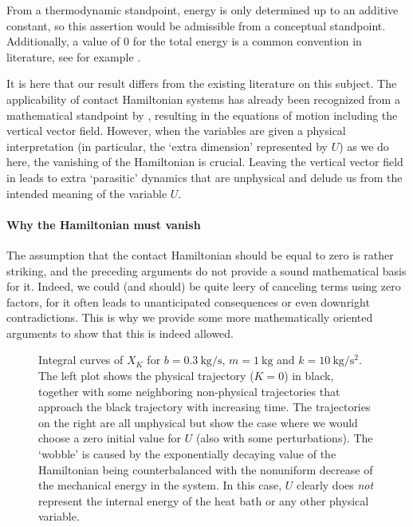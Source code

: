From a thermodynamic standpoint, energy is only determined up to an additive constant, so this assertion would be admissible from a conceptual standpoint. Additionally, a value of 0 for the total energy is a common convention in literature, see for example \citet{Fermi1936}.

It is here that our result differs from the existing literature on this subject. The applicability of contact Hamiltonian systems has already been recognized from a mathematical standpoint by \citet{Bravetti2017}, resulting in the equations of motion including the vertical vector field. However, when the variables are given a physical interpretation (in particular, the `extra dimension' represented by \(U\)) as we do here, the vanishing of the Hamiltonian is crucial.
Leaving the vertical vector field in leads to extra `parasitic' dynamics that are unphysical and delude us from the intended meaning of the variable \(U\).

\paragraph{Why the Hamiltonian must vanish} The assumption that the contact Hamiltonian should be equal to zero is rather striking, and the preceding arguments do not provide a sound mathematical basis for it. Indeed, we could (and should) be quite leery of canceling terms using zero factors, for it often leads to unanticipated consequences or even downright contradictions. This is why we provide some more mathematically oriented arguments to show that this is indeed allowed.

\begin{figure}[ht!]
    \centering
    
    \caption{Integral curves of \(X_K\) for \(b = \SI{0.3}{\kilogram \per \second}\), \( m = \SI{1}{\kilogram}\) and  \(k = \SI{10}{\kilogram \per \second \squared}\). The left plot shows the physical trajectory (\(K = 0\)) in black, together with some neighboring non-physical trajectories that approach the black trajectory with increasing time. The trajectories on the right are all unphysical but show the case where we would choose a zero initial value for \(U\) (also with some perturbations). The `wobble' is caused by the exponentially decaying value of the Hamiltonian being counterbalanced with the nonuniform decrease of the mechanical energy in the system. In this case, \(U\) clearly does \emph{not} represent the internal energy of the heat bath or any other physical variable.}
    \label{fig:dho_trajectories}
\end{figure}

